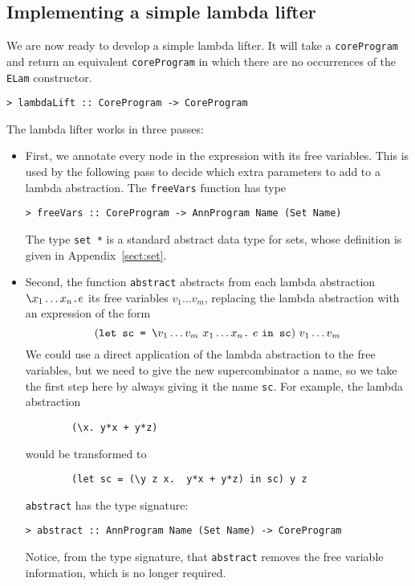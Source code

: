 \subsection{Implementing a simple lambda lifter}
\label{ll:mk1-imp}

We are now ready to develop a simple lambda lifter. It will take a
\mbox{\tt coreProgram} and return an equivalent \mbox{\tt coreProgram} in which there
are no occurrences of the \mbox{\tt ELam} constructor.
\begin{verbatim}
> lambdaLift :: CoreProgram -> CoreProgram
\end{verbatim}
%
The lambda lifter works in three passes:
\begin{itemize}
\item
First, we annotate every node in the expression with its free variables.
This is used by the following pass to decide which extra parameters
to add to a lambda abstraction.  The \mbox{\tt freeVars} function has type
\begin{verbatim}
> freeVars :: CoreProgram -> AnnProgram Name (Set Name)
\end{verbatim}
%
The type \mbox{\tt set\ *} is a standard abstract data type for sets, whose
definition is given in Appendix~\ref{sect:set}.

\item
Second, the function \mbox{\tt abstract} abstracts
from each lambda abstraction $\mbox{\tt {\char'134}}x_1\ldots x_n\mbox{\tt .}e$ its
free variables $v_1\ldots v_m$,
replacing the lambda abstraction with
an expression of the form
\[
(\mbox{\tt let\ sc\ =\ {\char'134}}v_1 \ldots v_m ~ x_1 \ldots x_n\mbox{\tt .}~e~\mbox{\tt in\ sc})~v_1 \ldots v_m
\]
We could use a direct application of the lambda abstraction to the free
variables, but we need to give the new supercombinator a name, so we take
the first step here by always giving it the name \mbox{\tt sc}.
For example, the lambda abstraction
\begin{verbatim}
        (\x. y*x + y*z)
\end{verbatim}
would be transformed to
\begin{verbatim}
        (let sc = (\y z x.  y*x + y*z) in sc) y z
\end{verbatim}
\mbox{\tt abstract} has the type signature:
\begin{verbatim}
> abstract :: AnnProgram Name (Set Name) -> CoreProgram
\end{verbatim}
%
Notice, from the type signature, that \mbox{\tt abstract} removes the free variable
information, which is no longer required.


\end{itemize}
